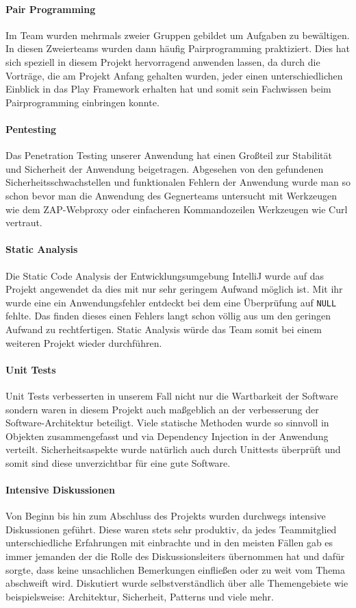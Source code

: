 \documentclass[12pt,DIV14,BCOR10mm,a4paper,parskip=half-,headsepline,headinclude,english,ngerman,bibliography=totocnumbered]{scrreprt}
\begin{document}
\paragraph{Pair Programming} Im Team wurden mehrmals zweier Gruppen gebildet um Aufgaben zu bewältigen. In diesen Zweierteams wurden dann häufig Pairprogramming praktiziert. Dies hat sich speziell in diesem Projekt hervorragend anwenden lassen, da durch die Vorträge, die am Projekt Anfang gehalten wurden, jeder einen unterschiedlichen Einblick in das Play Framework erhalten hat und somit sein Fachwissen beim Pairprogramming einbringen konnte.


\paragraph{Pentesting} Das Penetration Testing unserer Anwendung hat einen Großteil zur Stabilität und Sicherheit der Anwendung beigetragen. Abgesehen von den gefundenen Sicherheitsschwachstellen und funktionalen Fehlern der Anwendung wurde man so schon bevor man die Anwendung des Gegnerteams untersucht mit Werkzeugen wie dem ZAP-Webproxy oder einfacheren Kommandozeilen Werkzeugen wie Curl vertraut.

\paragraph{Static Analysis} Die Static Code Analysis der Entwicklungsumgebung IntelliJ wurde auf das Projekt angewendet da dies mit nur sehr geringem Aufwand möglich ist. Mit ihr wurde eine ein Anwendungsfehler entdeckt bei dem eine Überprüfung auf \texttt{NULL} fehlte. Das finden dieses einen Fehlers langt schon völlig aus um den geringen Aufwand zu rechtfertigen. Static Analysis würde das Team somit bei einem weiteren Projekt wieder durchführen.

\paragraph{Unit Tests} Unit Tests verbesserten in unserem Fall nicht nur die Wartbarkeit der Software sondern waren in diesem Projekt auch maßgeblich an der verbesserung der Software-Architektur beteiligt. Viele statische Methoden wurde so sinnvoll in Objekten zusammengefasst und via Dependency Injection in der Anwendung verteilt. Sicherheitsaspekte wurde natürlich auch durch Unittests überprüft und somit sind diese unverzichtbar für eine gute Software.

\paragraph{Intensive Diskussionen} Von Beginn bis hin zum Abschluss des Projekts wurden durchwegs intensive Diskussionen geführt. Diese waren stets sehr produktiv, da jedes Teammitglied unterschiedliche Erfahrungen mit einbrachte und in den meisten Fällen gab es immer jemanden der die Rolle des Diskussionsleiters übernommen hat und dafür sorgte, dass keine unsachlichen Bemerkungen einfließen oder zu weit vom Thema abschweift wird. Diskutiert wurde selbstverständlich über alle Themengebiete wie beispielsweise: Architektur, Sicherheit, Patterns und viele mehr.
\end{document}
